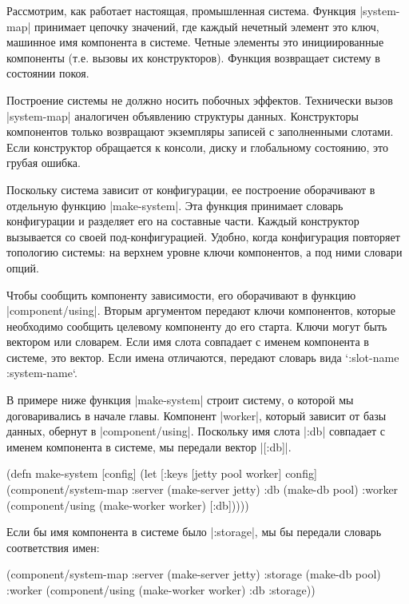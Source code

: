 Рассмотрим, как работает настоящая, промышленная система. Функция \spverb|system-map|
принимает цепочку значений, где каждый нечетный элемент это ключ, машинное имя
компонента в системе. Четные элементы это инициированные компоненты (т.е. вызовы
их конструкторов). Функция возвращает систему в состоянии покоя.

Построение системы не должно носить побочных эффектов. Технически вызов
\spverb|system-map| аналогичен объявлению структуры данных. Конструкторы компонентов
только возвращают экземпляры записей с заполненными слотами. Если конструктор
обращается к консоли, диску и глобальному состоянию, это грубая ошибка.

Поскольку система зависит от конфигурации, ее построение оборачивают в отдельную
функцию \spverb|make-system|. Эта функция принимает словарь конфигурации и разделяет
его на составные части. Каждый конструктор вызывается со своей
под-конфигурацией. Удобно, когда конфигурация повторяет топологию системы: на
верхнем уровне ключи компонентов, а под ними словари опций.

Чтобы сообщить компоненту зависимости, его оборачивают в функцию
\spverb|component/using|. Вторым аргументом передают ключи компонентов, которые
необходимо сообщить целевому компоненту до его старта. Ключи могут быть вектором
или словарем. Если имя слота совпадает с именем компонента в системе, это
вектор. Если имена отличаются, передают словарь вида `{:slot-name
:system-name}`.

В примере ниже функция \spverb|make-system| строит систему, о которой мы договаривались
в начале главы. Компонент \spverb|worker|, который зависит от базы данных, обернут в
\spverb|component/using|. Поскольку имя слота \spverb|:db| совпадает с именем компонента в
системе, мы передали вектор \spverb|[:db]|.

\begin{code}
(defn make-system
  [config]
  (let [{:keys [jetty pool worker]} config]
    (component/system-map
     :server (make-server jetty)
     :db     (make-db pool)
     :worker (component/using
              (make-worker worker)
              [:db]))))
\end{code}

Если бы имя компонента в системе было \spverb|:storage|, мы бы передали словарь
соответствия имен:

\begin{code}
(component/system-map
 :server  (make-server jetty)
 :storage (make-db pool)
 :worker  (component/using
           (make-worker worker)
           {:db :storage}))
\end{code}

